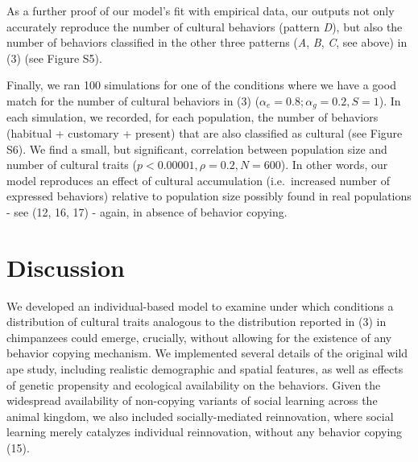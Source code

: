 \documentclass[9pt,twocolumn,twoside,]{pnas-new}
\begin{document}
As a further proof of our model's fit with empirical data, our outputs
not only accurately reproduce the number of cultural behaviors (pattern
\emph{D}), but also the number of behaviors classified in the other
three patterns (\emph{A}, \emph{B}, \emph{C}, see above) in (3) (see
Figure S5).

Finally, we ran 100 simulations for one of the conditions where we have
a good match for the number of cultural behaviors in (3)
(\(\alpha_e=0.8;\alpha_g=0.2, S=1\)). In each simulation, we recorded,
for each population, the number of behaviors (habitual + customary +
present) that are also classified as cultural (see Figure S6). We find a
small, but significant, correlation between population size and number
of cultural traits (\(p<0.00001,\rho=0.2,N=600\)). In other words, our
model reproduces an effect of cultural accumulation (i.e.~increased
number of expressed behaviors) relative to population size possibly
found in real populations - see (12, 16, 17) - again, in absence of
behavior copying.

\section*{Discussion}\label{discussion}

We developed an individual-based model to examine under which conditions
a distribution of cultural traits analogous to the distribution reported
in (3) in chimpanzees could emerge, crucially, without allowing for the
existence of any behavior copying mechanism. We implemented several
details of the original wild ape study, including realistic demographic
and spatial features, as well as effects of genetic propensity and
ecological availability on the behaviors. Given the widespread
availability of non-copying variants of social learning across the
animal kingdom, we also included socially-mediated reinnovation, where
social learning merely catalyzes individual reinnovation, without any
behavior copying (15).
\end{document}
